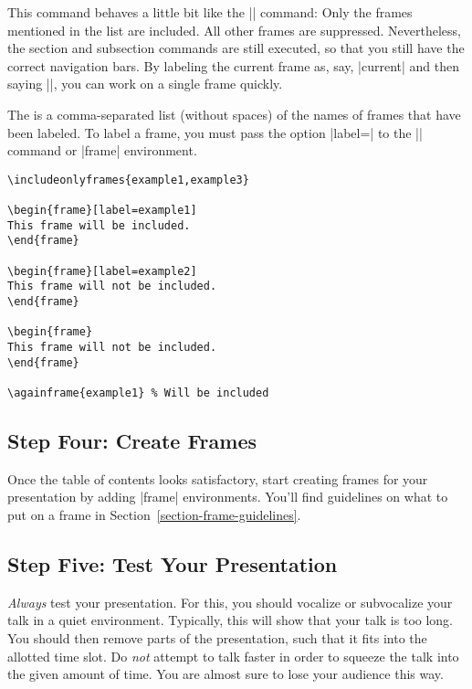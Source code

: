\begin{command}{{}}
  This command behaves a little bit like the || command: Only the frames mentioned in the list are included. All other frames are suppressed. Nevertheless, the section and subsection commands are still executed, so that you still have the correct navigation bars. By labeling the current frame as, say, |current| and then saying ||, you can work on a single frame quickly.

  The  is a comma-separated list (without spaces) of the names of frames that have been labeled. To label a frame, you must pass the option |label=| to the |\frame| command or |frame| environment.

  \example
\begin{verbatim}
\includeonlyframes{example1,example3}

\begin{frame}[label=example1]
This frame will be included. 
\end{frame}

\begin{frame}[label=example2]
This frame will not be included. 
\end{frame}

\begin{frame}
This frame will not be included.
\end{frame}

\againframe{example1} % Will be included
\end{verbatim}
\end{command}


\subsection{Step Four: Create Frames}

Once the table of contents looks satisfactory, start creating frames for your presentation by adding |frame| environments. You'll find guidelines on what to put on a frame in Section~\ref{section-frame-guidelines}.


\subsection{Step Five: Test Your Presentation}

\emph{Always} test your presentation. For this, you should vocalize or subvocalize your talk in a quiet environment. Typically, this will show that your talk is too long. You should then remove parts of the presentation, such that it fits into the allotted time slot. Do \emph{not} attempt to talk faster in order to squeeze the talk into the given amount of time. You are almost sure to lose your audience this way.

